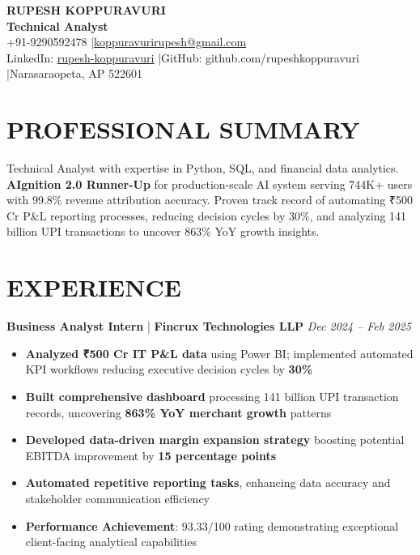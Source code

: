 \documentclass[letterpaper,11pt]{article}
\begin{document}
\begin{center}
  {\huge\bfseries RUPESH KOPPURAVURI}\\[4pt]
  {\large\textbf{Technical Analyst}}\\[6pt]
  \small +91-9290592478 \quad|\quad \href{mailto:koppuravurirupesh@gmail.com}{koppuravurirupesh@gmail.com}\\[2pt]
  \small LinkedIn: \href{https://www.linkedin.com/in/rupesh-koppuravuri/}{rupesh-koppuravuri} \quad|\quad GitHub: github.com/rupeshkoppuravuri \quad|\quad Narasaraopeta, AP 522601
\end{center}

\vspace{4pt}

\section*{PROFESSIONAL SUMMARY}
Technical Analyst with expertise in Python, SQL, and financial data analytics. \textbf{AIgnition 2.0 Runner-Up} for production-scale AI system serving 744K+ users with 99.8\% revenue attribution accuracy. Proven track record of automating ₹500 Cr P\&L reporting processes, reducing decision cycles by 30\%, and analyzing 141 billion UPI transactions to uncover 863\% YoY growth insights.

\vspace{2pt}

\section*{EXPERIENCE}
\textbf{Business Analyst Intern} | \textbf{Fincrux Technologies LLP} \hfill \textit{Dec 2024 – Feb 2025}
\begin{itemize}
  \item \textbf{Analyzed ₹500 Cr IT P\&L data} using Power BI; implemented automated KPI workflows reducing executive decision cycles by \textbf{30\%}
  \item \textbf{Built comprehensive dashboard} processing 141 billion UPI transaction records, uncovering \textbf{863\% YoY merchant growth} patterns
  \item \textbf{Developed data-driven margin expansion strategy} boosting potential EBITDA improvement by \textbf{15 percentage points}
  \item \textbf{Automated repetitive reporting tasks}, enhancing data accuracy and stakeholder communication efficiency
  \item \textbf{Performance Achievement}: 93.33/100 rating demonstrating exceptional client-facing analytical capabilities
\end{itemize}
\end{document}
